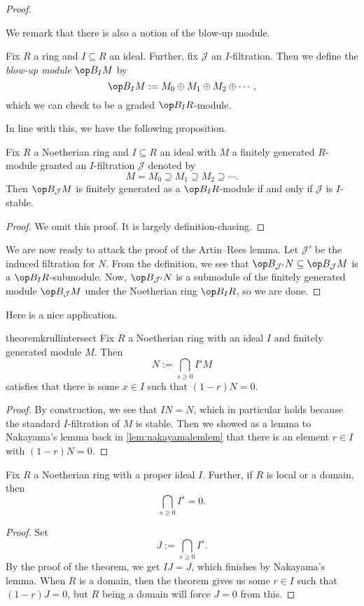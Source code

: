\begin{proof}
\begin{ex}
\begin{itemize}
		\end{itemize}
	\end{ex}
	We remark that there is also a notion of the blow-up module.
	\begin{definition}
		Fix $R$ a ring and $I\subseteq R$ an ideal. Further, fix $\mathcal J$ an $I$-filtration. Then we define the \textit{blow-up module} $\op B_IM$ by
		\[\op B_IM:=M_0\oplus M_1\oplus M_2\oplus\cdots,\]
		which we can check to be a graded $\op B_IR$-module.
	\end{definition}
	In line with this, we have the following proposition.
	\begin{proposition}
		Fix $R$ a Noetherian ring and $I\subseteq R$ an ideal with $M$ a finitely generated $R$-module granted an $I$-filtration $\mathcal J$ denoted by
		\[M=M_0\supseteq M_1\supseteq M_2\supseteq\cdots.\]
		Then $\op B_\mathcal JM$ is finitely generated as a $\op B_IR$-module if and only if $\mathcal J$ is $I$-stable.
	\end{proposition}
	\begin{proof}
		We omit this proof. It is largely definition-chasing.
	\end{proof}
	We are now ready to attack the proof of the Artin--Rees lemma. Let $\mathcal J'$ be the induced filtration for $N$. From the definition, we see that $\op B_{\mathcal J'}N\subseteq\op B_\mathcal JM$ is a $\op B_IR$-submodule. Now, $\op B_{\mathcal J'}N$ is a submodule of the finitely generated module $\op B_\mathcal JM$ under the Noetherian ring $\op B_IR$, so we are done.
\end{proof}
Here is a nice application.
\begin{restatable}{theorem}{krullintersect}
	Fix $R$ a Noetherian ring with an ideal $I$ and finitely generated module $M$. Then
	\[N:=\bigcap_{s\ge0}I^sM\]
	satisfies that there is some $x\in I$ such that $(1-r)N=0$.
\end{restatable}
\begin{proof}
	By construction, we see that $IN=N$, which in particular holds because the standard $I$-filtration of $M$ is stable. Then we showed as a lemma to Nakayama's lemma back in \autoref{lem:nakayamalemlem} that there is an element $r\in I$ with $(1-r)N=0$.
\end{proof}
\begin{corollary}
	Fix $R$ a Noetherian ring with a proper ideal $I$. Further, if $R$ is local or a domain, then
	\[\bigcap_{s\ge0}I^s=0.\]
\end{corollary}
\begin{proof}
	Set
	\[J:=\bigcap_{s\ge0}I^s.\]
	By the proof of the theorem, we get $IJ=J$, which finishes by Nakayama's lemma. When $R$ is a domain, then the theorem gives us some $r\in I$ such that $(1-r)J=0$, but $R$ being a domain will force $J=0$ from this.
\end{proof}
